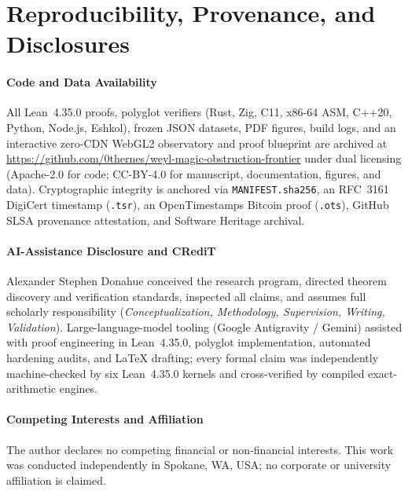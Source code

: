 \documentclass[11pt,reqno]{amsart}
\theoremstyle{definition}
\begin{document}
\section{Reproducibility, Provenance, and Disclosures}\label{sec:disclosures}

\paragraph{Code and Data Availability}
All Lean~4.35.0 proofs, polyglot verifiers (Rust, Zig, C11, x86-64 ASM, C++20, Python,
Node.js, Eshkol), frozen JSON datasets, PDF figures, build logs, and an interactive
zero-CDN WebGL2 observatory and proof blueprint are archived at
\url{https://github.com/0thernes/weyl-magic-obstruction-frontier}
under dual licensing (Apache-2.0 for code; CC-BY-4.0 for manuscript, documentation,
figures, and data). Cryptographic integrity is anchored via \texttt{MANIFEST.sha256},
an RFC~3161 DigiCert timestamp (\texttt{.tsr}), an OpenTimestamps Bitcoin proof
(\texttt{.ots}), GitHub SLSA provenance attestation, and Software Heritage archival.

\paragraph{AI-Assistance Disclosure and CRediT}
Alexander Stephen Donahue conceived the research program, directed theorem discovery and
verification standards, inspected all claims, and assumes full scholarly responsibility
(\emph{Conceptualization, Methodology, Supervision, Writing, Validation}). Large-language-model
tooling (Google Antigravity / Gemini) assisted with proof engineering in Lean~4.35.0,
polyglot implementation, automated hardening audits, and LaTeX drafting; every formal
claim was independently machine-checked by six Lean~4.35.0 kernels and cross-verified by
compiled exact-arithmetic engines.

\paragraph{Competing Interests and Affiliation}
The author declares no competing financial or non-financial interests. This work was
conducted independently in Spokane, WA, USA; no corporate or university affiliation is
claimed.



\end{document}
